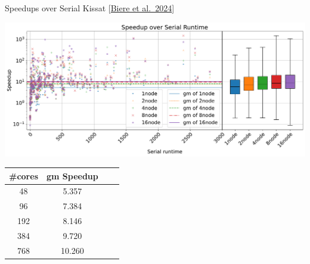 \documentclass[]{sdqbeamer}
\begin{document}
\begin{frame}{Speedups over Serial Kissat [\href{https://cca.informatik.uni-freiburg.de/papers/BiereFallerFazekasFleuryFroleyksPollitt-SAT-Competition-2024-solvers.pdf}{Biere et al.~2024}]}
    \begin{minipage}{.45\textwidth}
        \noindent
        \center
        \includegraphics[scale=.6]{plots/speedups_gim.pdf}
    \end{minipage}
    \hfill
    \begin{minipage}{.45\textwidth}
        \noindent
        \center
        \begin{table}[!h]
            \begin{tabular}{ cccc }
                \toprule
                \#cores & gm Speedup\\
                \midrule
                48 & 5.357\\
                96 & 7.384\\
                192 & 8.146\\
                384 & 9.720\\
                768 & 10.260\\
              \bottomrule
            \end{tabular}
    \end{table}
    \end{minipage}
\end{frame}
\end{document}
